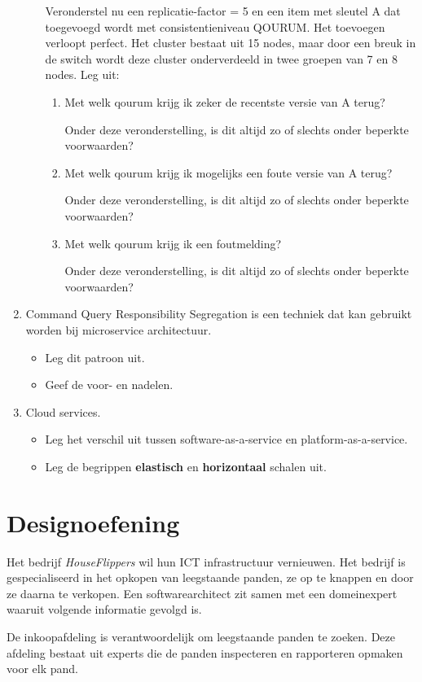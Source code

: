\documentclass{article}
\begin{document}
\begin{enumerate}
\begin{itemize}
		Veronderstel nu een replicatie-factor = 5 en een item met sleutel A dat toegevoegd wordt met consistentieniveau QOURUM. Het toevoegen verloopt perfect. Het cluster bestaat uit 15 nodes, maar door een breuk in de switch wordt deze cluster onderverdeeld in twee groepen van 7 en 8 nodes. Leg uit:
		\begin{enumerate}
			\item Met welk qourum krijg ik zeker de recentste versie van A terug?
			
			 Onder deze veronderstelling, is dit altijd zo of slechts onder beperkte voorwaarden?
			\item Met welk qourum krijg ik mogelijks een foute versie van A terug?
			
			 Onder deze veronderstelling, is dit altijd zo of slechts onder beperkte voorwaarden?
			\item Met welk qourum krijg ik een foutmelding? 
			
			Onder deze veronderstelling, is dit altijd zo of slechts onder beperkte voorwaarden?
		\end{enumerate}
	\end{itemize}
	\item Command Query Responsibility Segregation is een techniek dat kan gebruikt worden bij microservice architectuur.
	\begin{itemize}
		\item Leg dit patroon uit.
		\item Geef de voor- en nadelen.
	\end{itemize}
	\item Cloud services.
	\begin{itemize}
		\item Leg het verschil uit tussen software-as-a-service en platform-as-a-service.
		\item Leg de begrippen \textbf{elastisch} en \textbf{horizontaal} schalen uit.
	\end{itemize}
\end{enumerate}
\section*{Designoefening}
Het bedrijf \emph{HouseFlippers} wil hun ICT infrastructuur vernieuwen. Het bedrijf is gespecialiseerd in het opkopen van leegstaande panden, ze op te knappen en door ze daarna te verkopen. Een softwarearchitect zit samen met een domeinexpert waaruit volgende informatie gevolgd is.

De inkoopafdeling is verantwoordelijk om leegstaande panden te zoeken. Deze afdeling bestaat uit experts die de panden inspecteren en rapporteren opmaken voor elk pand.
\end{document}
